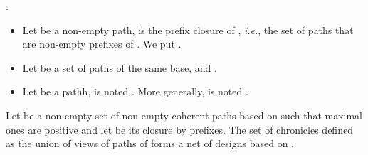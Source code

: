\documentclass{LMCS}
\def\ie{{\em i.e.}}
\begin{document}
:\hfill
\begin{itemize}[label=]
\item Let  be a non-empty path,  is the prefix closure of , \ie, the set of paths that are non-empty prefixes of . We put .
\item Let  be a set of paths of the same base,  and .
\item Let  be a pathh,  is noted
  . More generally,  is noted
  .
\end{itemize}


\begin{prop}\label{prop:pathsTOnet}
 Let  be a non empty set  of non empty coherent paths based   on   
such that maximal ones are positive and let  be its closure by prefixes. The set of chronicles  defined as the union of views of paths of  forms a net of designs based on . 
  \end{prop} 
\end{document}
